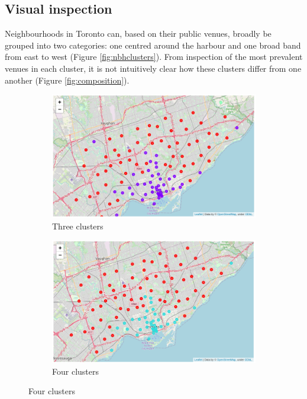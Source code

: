 \documentclass{article}
\begin{document}
\subsection{Visual inspection}
Neighbourhoods in Toronto can, based on their public venues, broadly be grouped into two categories: one centred around the harbour and one broad band from east to west (Figure \ref{fig:nbhclusters}). From inspection of the most prevalent venues in each cluster, it is not intuitively clear how these clusters differ from one another (Figure \ref{fig:composition}).
\begin{figure}[ht]
     \centering
     \begin{subfigure}[b]{0.47\textwidth}
         \centering
         \includegraphics[width=\textwidth]{pics/clusters3}
         \caption{Three clusters}
     \end{subfigure}
     \hfill
     \begin{subfigure}[b]{0.47\textwidth}
         \centering
         \includegraphics[width=\textwidth]{pics/clusters4}
         \caption{Four clusters}

\end{subfigure}
\end{figure}
\end{document}

